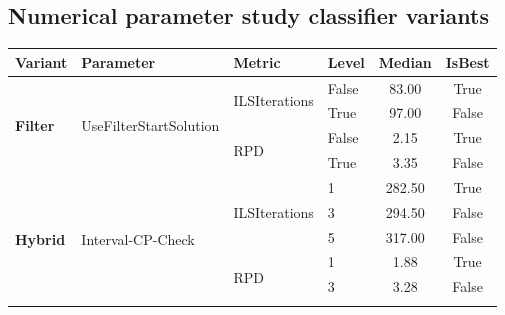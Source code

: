 \subsection{Numerical parameter study classifier variants}
\begin{table}[!ht]
	\footnotesize
	\centering
	\renewcommand{\multirowsetup}{\centering}
	\renewcommand{\arraystretch}{1.04}
	\begin{tabular}{@{}l|l|l|l|c|c @{}}
		\textbf{Variant}                   & \textbf{Parameter}                        & \textbf{Metric}                  & \textbf{Level}       & \textbf{Median} & \textbf{IsBest} \\
		\hline
		\multirow{4}{*}{\textbf{Filter}}   & \multirow{4}{*}{UseFilterStartSolution}   & \multirow{2}{*}{ILSIterations}   & False                & 83.00           & True            \\\cline{4-6}
		                                   &                                           &                                  & True                 & 97.00           & False           \\\cline{3-6}
		                                   &                                           & \multirow{2}{*}{RPD}             & False                & 2.15            & True            \\\cline{4-6}
		                                   &                                           &                                  & True                 & 3.35            & False           \\\hline
		\multirow{24}{*}{\textbf{Hybrid}}  & \multirow{9}{*}{Interval-CP-Check}        & \multirow{3}{*}{ILSIterations}   & 1                    & 282.50          & True            \\\cline{4-6}
		                                   &                                           &                                  & 3                    & 294.50          & False           \\\cline{4-6}
		                                   &                                           &                                  & 5                    & 317.00          & False           \\\cline{3-6}
		                                   &                                           & \multirow{3}{*}{RPD}             & 1                    & 1.88            & True            \\\cline{4-6}
		                                   &                                           &                                  & 3                    & 3.28            & False           \\\cline{4-6}

\end{tabular}
\end{table}
